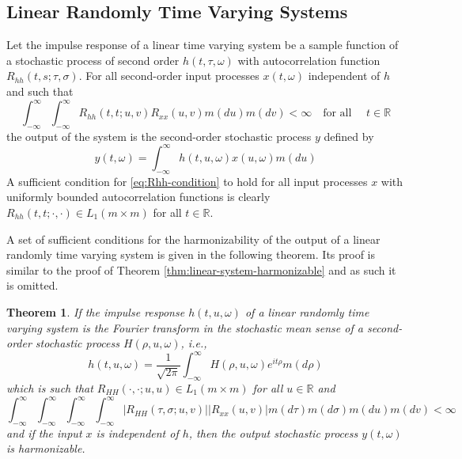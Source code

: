 \documentclass{article}
\newcommand{\cdummy}{\cdot}
\newtheorem{theorem}{Theorem}
\begin{document}
\subsection{Linear Randomly Time Varying Systems}\label{subsec:random-systems}

Let the impulse response of a linear time varying system be a sample function
of a stochastic process of second order $h (t, \tau, \omega)$ with
autocorrelation function $R_{hh} (t, s ; \tau, \sigma)$. For all second-order
input processes $x (t, \omega)$ independent of $h$ and such that
\begin{equation}
  \int_{- \infty}^{\infty} \int_{- \infty}^{\infty} R_{hh} (t, t ; u, v)
  R_{xx} (u, v) m (du) m (dv) < \infty \quad \text{for all } \quad t \in
  \mathbb{R} \label{eq:Rhh-condition}
\end{equation}
the output of the system is the second-order stochastic process $y$ defined by
\begin{equation}
  y (t, \omega) = \int_{- \infty}^{\infty} h (t, u, \omega) x (u, \omega) m
  (du) \label{eq:y-random}
\end{equation}
A sufficient condition for \eqref{eq:Rhh-condition} to hold for all input
processes $x$ with uniformly bounded autocorrelation functions is clearly
$R_{hh} (t, t ; \cdot, \cdot) \in L_1  (m \times m)$ for all $t \in
\mathbb{R}$.

A set of sufficient conditions for the harmonizability of the output of a
linear randomly time varying system is given in the following theorem. Its
proof is similar to the proof of Theorem \ref{thm:linear-system-harmonizable}
and as such it is omitted.

\begin{theorem}
  \label{thm:random-system-harmonizable}If the impulse response $h (t, u,
  \omega)$ of a linear randomly time varying system is the Fourier transform
  in the stochastic mean sense of a second-order stochastic process $H (\rho,
  u, \omega)$, i.e.,
  \begin{equation}
    h (t, u, \omega) = \frac{1}{\sqrt{2 \pi}}  \int_{- \infty}^{\infty} H
    (\rho, u, \omega) e^{it \rho} m (d \rho) \label{eq:h-H-transform}
  \end{equation}
  which is such that $R_{HH} (\cdummy, \cdummy ; u, u) \in L_1  (m \times m)$
  for all $u \in \mathbb{R}$ and
  \begin{equation}
    \int_{- \infty}^{\infty} \int_{- \infty}^{\infty} \int_{- \infty}^{\infty}
    \int_{- \infty}^{\infty} |R_{HH} (\tau, \sigma ; u, v) ||R_{xx} (u, v) | m
    (d \tau) m (d \sigma) m (du) m (dv) < \infty \label{eq:RHH-condition}
  \end{equation}
  and if the input $x$ is independent of $h$, then the output stochastic
  process $y (t, \omega)$ is harmonizable.
\end{theorem}
\end{document}
